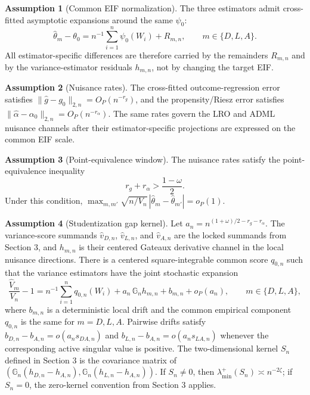 \documentclass[11pt]{article}
\theoremstyle{definition}
\newtheorem{assumption}{Assumption}
\theoremstyle{plain}
\theoremstyle{remark}
\begin{document}
\begin{assumption}[Common EIF normalization]\label{ass:normalization}
The three estimators admit cross-fitted asymptotic expansions around the same
\(\psi_0\):
\[
  \widehat\theta_m-\theta_0
  = n^{-1}\sum_{i=1}^n \psi_0(W_i)+R_{m,n},\qquad m\in\{D,L,A\}.
\]
All estimator-specific differences are therefore carried by the remainders
\(R_{m,n}\) and by the variance-estimator residuals \(h_{m,n}\), not by
changing the target EIF.
\end{assumption}

\begin{assumption}[Nuisance rates]\label{ass:rates}
The cross-fitted outcome-regression error satisfies
\(\|\widehat g-g_0\|_{2,n}=O_P(n^{-r_g})\), and the propensity/Riesz error
satisfies \(\|\widehat\alpha-\alpha_0\|_{2,n}=O_P(n^{-r_\alpha})\).  The same
rates govern the LRO and ADML nuisance channels after their estimator-specific
projections are expressed on the common EIF scale.
\end{assumption}

\begin{assumption}[Point-equivalence window]\label{ass:point-window}
The nuisance rates satisfy the point-equivalence inequality
\[
  r_g+r_\alpha>\frac{1-\omega}{2}.
\]
Under this condition,
\(\max_{m,m'}\sqrt{n/V_n}\,|\widehat\theta_m-\widehat\theta_{m'}|=o_P(1)\).
\end{assumption}

\begin{assumption}[Studentization gap kernel]\label{ass:student-kernel}
Let \(a_n=n^{(1+\omega)/2-r_g-r_\alpha}\).  The variance-score summands
\(\widehat v_{D,n}\), \(\widehat v_{L,n}\), and \(\widehat v_{A,n}\) are the
locked summands from Section 3, and \(h_{m,n}\) is their centered Gateaux
derivative channel in the local nuisance directions.  There is a centered
square-integrable common score \(q_{0,n}\) such that the variance estimators
have the joint stochastic expansion
\[
  \frac{\widehat V_m}{V_n}-1
  = n^{-1}\sum_{i=1}^n q_{0,n}(W_i)
    +a_n\,\mathbb G_n h_{m,n}+b_{m,n}+o_P(a_n),
  \qquad m\in\{D,L,A\},
\]
where \(b_{m,n}\) is a deterministic local drift and the common empirical
component \(q_{0,n}\) is the same for \(m=D,L,A\).  Pairwise drifts satisfy
\(b_{D,n}-b_{A,n}=o(a_n s_{DA,n})\) and
\(b_{L,n}-b_{A,n}=o(a_n s_{LA,n})\) whenever the corresponding active singular
value is positive.  The two-dimensional kernel \(S_n\) defined in Section 3 is
the covariance matrix of
\((\mathbb G_n(h_{D,n}-h_{A,n}),\mathbb G_n(h_{L,n}-h_{A,n}))\).  If
\(S_n\ne0\), then \(\lambda_{\min}^+(S_n)\asymp n^{-2\zeta}\); if \(S_n=0\),
the zero-kernel convention from Section 3 applies.
\end{assumption}
\end{document}
